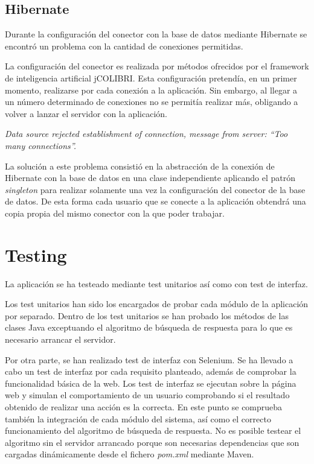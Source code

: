 \subsection{Hibernate}

Durante la configuración del conector con la base de datos mediante Hibernate se encontró un problema con la cantidad de conexiones permitidas.

La configuración del conector es realizada por métodos ofrecidos por el framework de inteligencia artificial jCOLIBRI. Esta configuración pretendía, en un primer momento, realizarse por cada conexión a la aplicación. Sin embargo, al llegar a un número determinado de conexiones no se permitía realizar más, obligando a volver a lanzar el servidor con la aplicación.

\emph{Data source rejected establishment of connection, message from server: “Too many connections”.}

La solución a este problema consistió en la abstracción de la conexión de Hibernate con la base de datos en una clase independiente aplicando el patrón \emph{singleton} para realizar solamente una vez la configuración del conector de la base de datos. De esta forma cada usuario que se conecte a la aplicación obtendrá una copia propia del mismo conector con la que poder trabajar.


\section{Testing}

La aplicación se ha testeado mediante test unitarios así como con test de interfaz.

Los test unitarios han sido los encargados de probar cada módulo de la aplicación por separado. Dentro de los test unitarios se han probado los métodos de las clases Java exceptuando el algoritmo de búsqueda de respuesta para lo que es necesario arrancar el servidor.

Por otra parte, se han realizado test de interfaz con Selenium. Se ha llevado a cabo un test de interfaz por cada requisito planteado, además de comprobar la funcionalidad básica de la web. Los test de interfaz se ejecutan sobre la página web y simulan el comportamiento de un usuario comprobando si el resultado obtenido de realizar una acción es la correcta. En este punto se comprueba también la integración de cada módulo del sistema, así como el correcto funcionamiento del algoritmo de búsqueda de respuesta. No es posible testear el algoritmo sin el servidor arrancado porque son necesarias dependencias que son cargadas dinámicamente desde el fichero \emph{pom.xml} mediante Maven.

